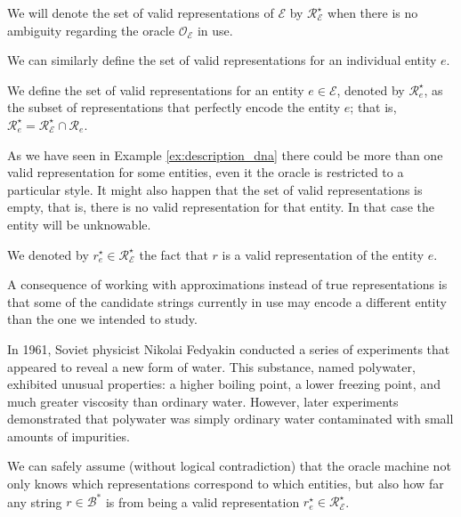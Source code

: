\begin{notation}
We will denote the set of valid representations of $\mathcal{E}$ by $\mathcal{R}^\star_\mathcal{E}$ when there is no ambiguity regarding the oracle $\mathcal{O}_\mathcal{E}$ in use.
\end{notation}

We can similarly define the set of valid representations for an individual entity $e$.

\begin{definition}
We define the set of valid representations for an entity $e \in \mathcal{E}$, denoted by $\mathcal{R}^\star_e$, as the subset of representations that perfectly encode the entity $e$; that is, $\mathcal{R}^\star_e = \mathcal{R}^\star_\mathcal{E} \cap \mathcal{R}_e$.
\end{definition}

As we have seen in Example \ref{ex:description_dna} there could be more than one valid representation for some entities, even it the oracle is restricted to a particular style. It might also happen that the set of valid representations is empty, that is, there is no valid representation for that entity. In that case the entity will be unknowable.

\begin{notation}
We denoted by $r^\star_e \in \mathcal{R}^\star_\mathcal{E}$ the fact that $r$ is a valid representation of the entity $e$.
\end{notation}

A consequence of working with approximations instead of true representations is that some of the candidate strings currently in use may encode a different entity than the one we intended to study.

\begin{example}
\label{ex:polywater}
In 1961, Soviet physicist Nikolai Fedyakin conducted a series of experiments that appeared to reveal a new form of water. This substance, named polywater, exhibited unusual properties: a higher boiling point, a lower freezing point, and much greater viscosity than ordinary water. However, later experiments demonstrated that polywater was simply ordinary water contaminated with small amounts of impurities.
\end{example}

We can safely assume (without logical contradiction) that the oracle machine not only knows which representations correspond to which entities, but also how far any string $r \in \mathcal{B}^\ast$ is from being a valid representation $r^\star_e \in \mathcal{R}^\star_\mathcal{E}$.


